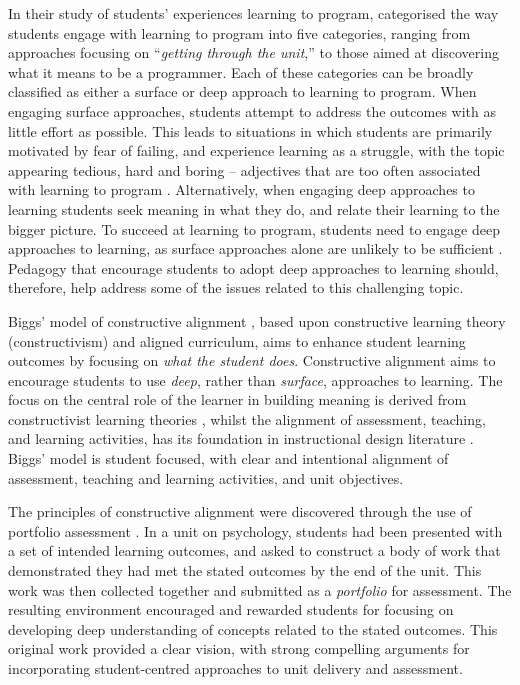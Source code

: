 In their study of students' experiences learning to program, \citet{Bruce:2003} categorised the way students engage with learning to program into five categories, ranging from approaches focusing on ``\emph{getting through the unit},'' to those aimed at discovering what it means to be a programmer. Each of these categories can be broadly classified as either a surface or deep approach to learning \cite{Marton:1976a,Ramsden:1992} to program. When engaging surface approaches, students attempt to address the outcomes with as little effort as possible. This leads to situations in which students are primarily motivated by fear of failing, and experience learning as a struggle, with the topic appearing tedious, hard and boring -- adjectives that are too often associated with learning to program \cite{McGettrick:2005}. Alternatively, when engaging deep approaches to learning students seek meaning in what they do, and relate their learning to the bigger picture. To succeed at learning to program, students need to engage deep approaches to learning, as surface approaches alone are unlikely to be sufficient \cite{Bruce:2003}. Pedagogy that encourage students to adopt deep approaches to learning should, therefore, help address some of the issues related to this challenging topic.

Biggs' model of constructive alignment \cite{Biggs:1996c,Biggs:2007}, based upon constructive learning theory (constructivism) and aligned curriculum, aims to enhance student learning outcomes by focusing on \emph{what the student does}. Constructive alignment aims to encourage students to use \emph{deep}, rather than \emph{surface}, approaches to learning. The focus on the central role of the learner in building meaning is derived from constructivist learning theories \cite{Piaget:1950,Phillips:1995,Steffe:1995,Jonassen:1991,Vrasidas:2000}, whilst the alignment of assessment, teaching, and learning activities, has its foundation in instructional design literature \cite{Tyler:1969,Cohen:1987,Ramsden:1992}. Biggs' model is student focused, with clear and intentional alignment of assessment, teaching and learning activities, and unit objectives.

The principles of constructive alignment were discovered through the use of portfolio assessment \cite{Biggs:1996c}. In a unit on psychology, students had been presented with a set of intended learning outcomes, and asked to construct a body of work that demonstrated they had met the stated outcomes by the end of the unit. This work was then collected together and submitted as a \emph{portfolio} for assessment. The resulting environment encouraged and rewarded students for focusing on developing deep understanding of concepts related to the stated outcomes. This original work provided a clear vision, with strong compelling arguments for incorporating student-centred approaches to unit delivery and assessment.

